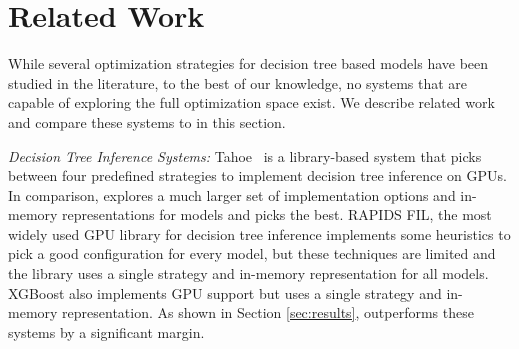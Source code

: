 \section{Related Work}
\label{Sec:Related}
While several optimization strategies for decision tree based models have been 
studied in the literature, to the best of our knowledge, no systems that are 
capable of exploring the full optimization space exist. We describe related work 
and compare these systems to \Treebeard{} in this section.

\emph{Decision Tree Inference Systems:} 
Tahoe~\cite{Tahoe} is a library-based system that picks 
between four predefined strategies to implement decision tree inference on GPUs.
In comparison, \Treebeard{} explores a much larger set of implementation options and 
in-memory representations for models and picks the best.
RAPIDS FIL\cite{FIL}, the most widely used GPU library for decision tree inference
implements some heuristics to pick a good configuration for every model, 
but these techniques are limited and the library uses a single strategy 
and in-memory representation for all models. XGBoost \cite{XGBoost} also implements GPU 
support\cite{XGBGPU} but uses a single strategy and in-memory representation. 
As shown in Section \ref{sec:results}, \Treebeard{} outperforms
these systems by a significant margin.

